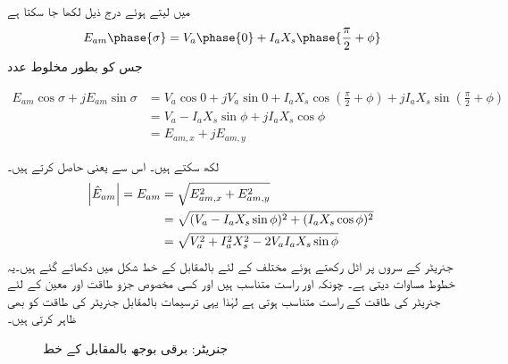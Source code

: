 میں  لیتے ہوئے درج ذیل لکھا جا سکتا ہے
\begin{align}
E_{am}\phase{\sigma}=V_a \phase{0} +I_a X_s \phase{\frac{\pi}{2}+\phi}
\end{align}
جس کو بطور مخلوط عدد
\begin{small}
\begin{align*}
E_{am} \cos \sigma +j E_{am} \sin \sigma&=V_a \cos 0+j V_a \sin 0 + I_a X_s \cos \left(\frac{\pi}{2}+\phi \right)+j I_a X_s \sin \left(\frac{\pi}{2}+\phi \right)\\
&=V_a  - I_a X_s \sin \phi+j I_a X_s \cos \phi\\
&=E_{am,x}+j E_{am,y}
\end{align*}
\end{small}
لکھ سکتے ہیں۔ اس  سے  یعنی    حاصل کرتے ہیں۔
\begin{gather}
\begin{aligned}\label{مساوات_معاصر_رو_بالمقابل_دباو}
\abs{\hat{E}_{am}}=E_{am}&=\sqrt{E_{am,x}^2+E_{am,y}^2}\\
&=\sqrt{(V_a  - I_a X_s \sin \phi)^2+(I_a X_s \cos \phi)^2}\\
&=\sqrt{V_a^2+I_a^2 X_s^2 -2 V_a I_a X_s \sin \phi}
\end{aligned}
\end{gather}
جنریٹر کے سروں پر   اٹل رکھتے ہوئے مختلف  کے لئے  بالمقابل  کے خط شکل   میں دکھائے گئے ہیں۔یہ خطوط مساوات  دیتی ہے۔ چونکہ   اور    راست متناسب ہیں اور کسی  مخصوص جزو طاقت اور معین  کے لئے جنریٹر کی طاقت  کے   راست متناسب ہوتی ہے لہٰذا یہی ترسیمات  بالمقابل جنریٹر کی طاقت کو بھی ظاہر کرتی ہیں۔
\begin{figure}
\centering
\caption{جنریٹر: برقی بوجھ بالمقابل  کے خط}
\label{شکل_معاصر_بار_بالمقابل_میدانی_رو}
\end{figure}
